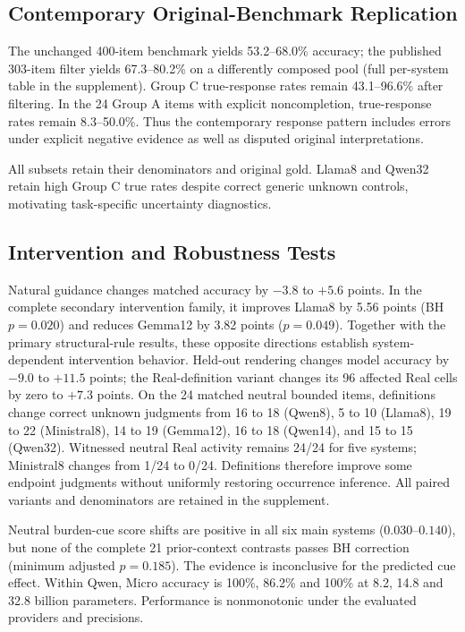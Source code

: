 \documentclass[sigconf,anonymous,review]{acmart}
\begin{document}
\subsection{Contemporary Original-Benchmark Replication}
The unchanged 400-item benchmark yields 53.2--68.0\% accuracy; the published 303-item filter yields 67.3--80.2\% on a differently composed pool (full per-system table in the supplement). Group C true-response rates remain 43.1--96.6\% after filtering. In the 24 Group A items with explicit noncompletion, true-response rates remain 8.3--50.0\%. Thus the contemporary response pattern includes errors under explicit negative evidence as well as disputed original interpretations.

All subsets retain their denominators and original gold. Llama8 and Qwen32 retain high Group C true rates despite correct generic unknown controls, motivating task-specific uncertainty diagnostics.

\subsection{Intervention and Robustness Tests}
\label{sec:robustness}
Natural guidance changes matched accuracy by $-3.8$ to $+5.6$ points. In the complete secondary intervention family, it improves Llama8 by 5.56 points (BH $p=0.020$) and reduces Gemma12 by 3.82 points ($p=0.049$). Together with the primary structural-rule results, these opposite directions establish system-dependent intervention behavior. Held-out rendering changes model accuracy by $-9.0$ to $+11.5$ points; the Real-definition variant changes its 96 affected Real cells by zero to $+7.3$ points. On the 24 matched neutral bounded items, definitions change correct unknown judgments from 16 to 18 (Qwen8), 5 to 10 (Llama8), 19 to 22 (Ministral8), 14 to 19 (Gemma12), 16 to 18 (Qwen14), and 15 to 15 (Qwen32). Witnessed neutral Real activity remains 24/24 for five systems; Ministral8 changes from 1/24 to 0/24. Definitions therefore improve some endpoint judgments without uniformly restoring occurrence inference. All paired variants and denominators are retained in the supplement.

Neutral burden-cue score shifts are positive in all six main systems ($0.030$--$0.140$), but none of the complete 21 prior-context contrasts passes BH correction (minimum adjusted $p=0.185$). The evidence is inconclusive for the predicted cue effect. Within Qwen, Micro accuracy is 100\%, 86.2\% and 100\% at 8.2, 14.8 and 32.8 billion parameters. Performance is nonmonotonic under the evaluated providers and precisions.
\end{document}
